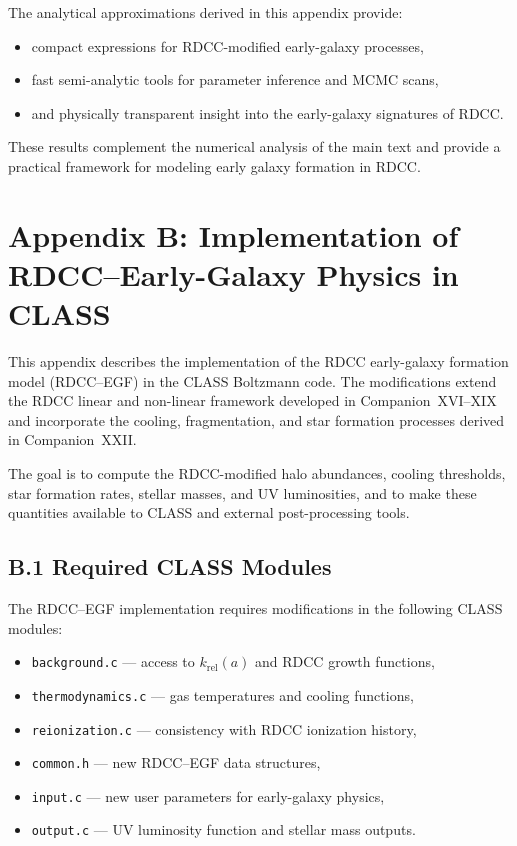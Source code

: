 \documentclass[11pt,a4paper]{article}
\begin{document}
The analytical approximations derived in this appendix provide:

\begin{itemize}
    \item compact expressions for RDCC-modified early-galaxy processes,
    \item fast semi-analytic tools for parameter inference and MCMC scans,
    \item and physically transparent insight into the early-galaxy signatures of RDCC.
\end{itemize}

These results complement the numerical analysis of the main text and provide a practical 
framework for modeling early galaxy formation in RDCC.

\section*{Appendix B: Implementation of RDCC–Early-Galaxy Physics in CLASS}

This appendix describes the implementation of the RDCC early-galaxy formation model 
(RDCC–EGF) in the CLASS Boltzmann code. The modifications extend the RDCC linear and 
non-linear framework developed in Companion~XVI–XIX and incorporate the cooling, fragmentation, 
and star formation processes derived in Companion~XXII.

The goal is to compute the RDCC-modified halo abundances, cooling thresholds, star formation 
rates, stellar masses, and UV luminosities, and to make these quantities available to CLASS 
and external post-processing tools.

\subsection*{B.1 Required CLASS Modules}

The RDCC–EGF implementation requires modifications in the following CLASS modules:

\begin{itemize}
    \item \texttt{background.c} — access to $k_{\mathrm{rel}}(a)$ and RDCC growth functions,
    \item \texttt{thermodynamics.c} — gas temperatures and cooling functions,
    \item \texttt{reionization.c} — consistency with RDCC ionization history,
    \item \texttt{common.h} — new RDCC–EGF data structures,
    \item \texttt{input.c} — new user parameters for early-galaxy physics,
    \item \texttt{output.c} — UV luminosity function and stellar mass outputs.
\end{itemize}
\end{document}
